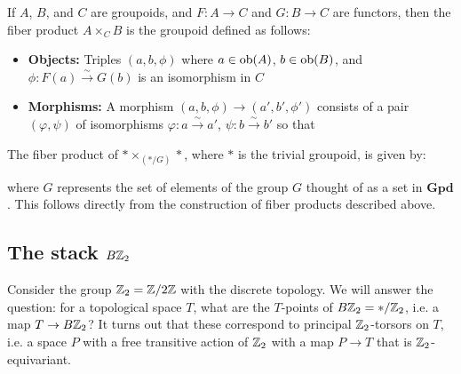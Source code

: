 \documentclass[12pt]{article}
\begin{document}
\begin{definition}
    If $A$, $B$, and $C$ are groupoids, and $F : A \rightarrow C$ and $G : B \rightarrow C$ are functors, then the fiber product $A \times_C B$ is the groupoid defined as follows:

    \begin{itemize}
        \item \textbf{Objects:} Triples $(a, b, \phi)$ where $a \in \operatorname{ob}(A)$, $b \in \operatorname{ob}(B)$, and $\phi : F(a) \stackrel{\sim}{\rightarrow} G(b)$ is an isomorphism in $C$

        \item \textbf{Morphisms:} A morphism $(a, b, \phi) \rightarrow (a', b', \phi')$ consists of a pair $(\varphi, \psi)$ of isomorphisms $\varphi : a \stackrel{\sim}{\rightarrow} a'$, $\psi : b \stackrel{\sim}{\rightarrow} b'$ so that
              \begin{center}
              \end{center}
    \end{itemize}
\end{definition}

\begin{example}
    The fiber product of $* \times_{(*/G)} *$, where $*$ is the trivial groupoid, is given by:
    \begin{center}
    \end{center}
    where $G$ represents the set of elements of the group $G$ thought of as a set in $\textbf{Gpd}$. This follows directly from the construction of fiber products described above.
\end{example}



\subsection{The stack $B\mathbb{Z}_2$}
Consider the group $\mathbb{Z}_2 = \mathbb{Z}/2\mathbb{Z}$ with the discrete topology. We will answer the question: for a topological space $T$, what are the $T$-points of $B\mathbb{Z}_2 = */\mathbb{Z}_2$, i.e. a map $T \to B\mathbb{Z}_2$? It turns out that these correspond to principal $\mathbb{Z}_2$-torsors on $T$, i.e. a space $P$ with a free transitive action of $\mathbb{Z}_2$ with a map $P \to T$ that is $\mathbb{Z}_2$-equivariant.
\end{document}
